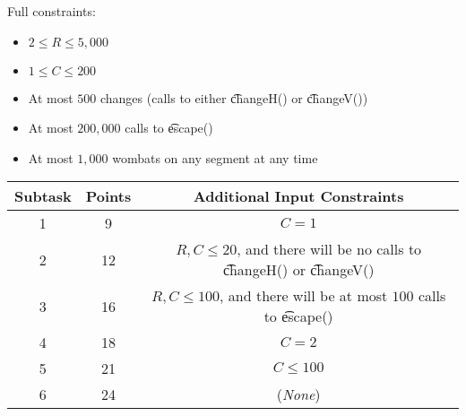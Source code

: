 Full constraints:
\begin{itemize}
\item $2 \leq R \leq 5,000$
\item $1 \leq C \leq 200$
\item At most $500$ changes (calls to either \t{changeH()} or \t{changeV()})
\item At most $200,000$ calls to \t{escape()}
\item At most $1,000$ wombats on any segment at any time
\end{itemize}
\begin{center}
\begin{tabular}{ |c|c|c| }
\hline
Subtask & Points & Additional Input Constraints\\
\hline
1 & 9 & $C=1$\\
\hline
2 & 12 & $R,C \leq 20$, and there will be no calls to \t{changeH()} or \t{changeV()}\\
\hline
3 & 16 & $R,C \leq 100$, and there will be at most $100$ calls to \t{escape()}\\
\hline
4 & 18 & $C=2$\\
\hline
5 & 21 & $C \leq 100$\\
\hline
6 & 24 & (\textit{None})\\
\hline
\end{tabular}
\end{center}
